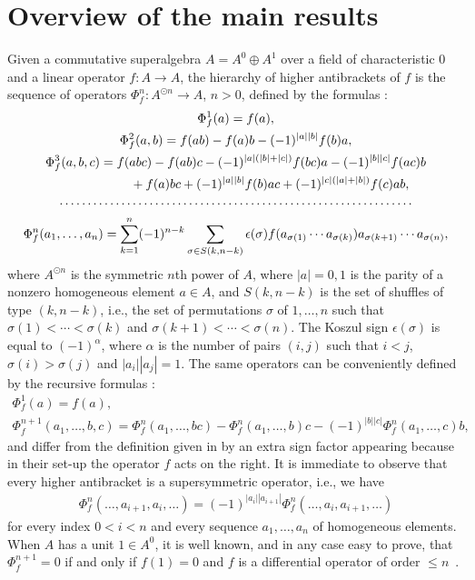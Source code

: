 \section{Overview of the main results}\label{sec.overview}

Given a commutative superalgebra $A=A^{0}\oplus A^{1}$ over a f\/ield of characteristic 0 and a linear operator $f\colon A\to A$, the hierarchy of higher antibrackets of $f$ is the sequence of operators $\Phi_f^n\colon A^{\odot n}\to A$, $n>0$, def\/ined by the formulas \cite{koszul85,markl2}:
\begin{gather}
\Phi^1_f(a)= f(a),\nonumber\\
\Phi^2_f(a,b)= f(ab)-f(a)b-(-1)^{|a||b|}f(b)a,\nonumber\\
\Phi^3_f(a,b,c)= f(abc)-f(ab)c-(-1)^{|a|(|b|+|c|)}f(bc)a-(-1)^{|b||c|}f(ac)b\nonumber\\
\hphantom{\Phi^3_f(a,b,c)=}{} +f(a)bc+(-1)^{|a||b|}f(b)ac+(-1)^{|c|(|a|+|b|)} f(c)ab ,\nonumber\\
\cdots\cdots\cdots\cdots\cdots\cdots\cdots\cdots\cdots\cdots\cdots\cdots\cdots\cdots\cdots\cdots\cdots\cdots\cdots\cdots\cdots\nonumber\\
\Phi^n_f(a_1,\ldots,a_n)= \sum_{k=1}^n(-1)^{n-k}\sum_{\sigma\in S(k,n-k)}\epsilon(\sigma)
f(a_{\sigma(1)}\cdots a_{\sigma(k)})a_{\sigma(k+1)}\cdots a_{\sigma(n)} ,\label{equ.defiKoszul}
\end{gather}
where $A^{\odot n}$ is the symmetric $n$th power of $A$, where $|a|=0,1$ is the parity of a nonzero homogeneous element $a\in A$, and
$S(k,n-k)$ is the set of shuf\/f\/les of type $(k,n-k)$, i.e., the set of permutations $\sigma$ of $1,\ldots,n$
such that $\sigma(1)<\cdots<\sigma(k)$ and $\sigma(k+1)<\cdots<\sigma(n)$. The Koszul sign
$\epsilon(\sigma)$ is equal to $(-1)^{\alpha}$, where $\alpha$ is the number of pairs $(i,j)$ such that
$i<j$, $\sigma(i)>\sigma(j)$ and $|a_i||a_j|=1$. The same operators can be conveniently def\/ined by the recursive formulas \cite{akman}:
\begin{gather}
\Phi^1_f(a)=f(a),\nonumber\\
\Phi^{n+1}_f(a_1,\ldots,b,c) = \Phi^{n}_f(a_1,\ldots,bc)-\Phi^{n}_f(a_1,\ldots,b)c-(-1)^{|b||c|}\Phi^{n}_f(a_1,\ldots,c)b,\label{equ.defiakman}
\end{gather}
and dif\/fer from the def\/inition given in \cite{alfaro,BDA} by an extra sign factor appearing because in their set-up the operator $f$ acts on the right.
It is immediate to observe that every higher antibracket is a supersymmetric operator, i.e., we have
\begin{gather*} \Phi_f^n(\ldots,a_{i+1},a_i,\ldots)=(-1)^{|a_i| |a_{i+1}|}\Phi_f^n(\ldots,a_{i},a_{i+1},\ldots)\end{gather*}
for every index $0<i<n$ and every sequence $a_1,\ldots,a_n$ of homogeneous elements.
When $A$ has a unit $1\in A^0$, it is well known, and in any case easy to prove, that $\Phi^{n+1}_f=0$
if and only if $f(1)=0$ and $f$ is a dif\/ferential operator of order $\le n$~\cite{koszul85}.

